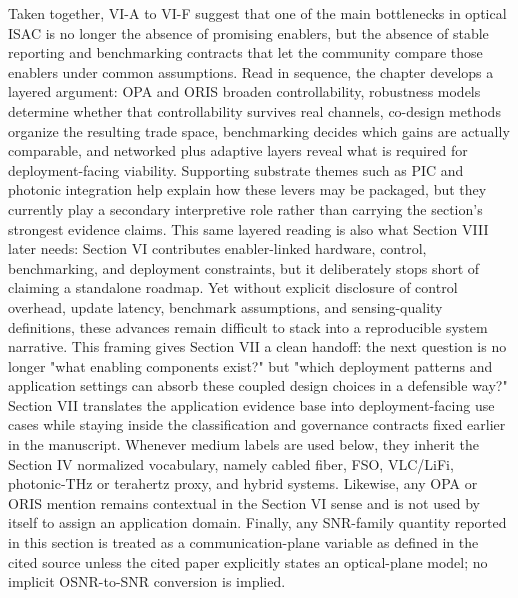 {}
\markdownRendererSectionEnd \markdownRendererSectionBegin
{}\markdownRendererInterblockSeparator
{}Taken together, VI-A to VI-F suggest that one of the main bottlenecks in optical ISAC is no longer the absence of promising enablers, but the absence of stable reporting and benchmarking contracts that let the community compare those enablers under common assumptions. Read in sequence, the chapter develops a layered argument: OPA and ORIS broaden controllability, robustness models determine whether that controllability survives real channels, co-design methods organize the resulting trade space, benchmarking decides which gains are actually comparable, and networked plus adaptive layers reveal what is required for deployment-facing viability. Supporting substrate themes such as PIC and photonic integration help explain how these levers may be packaged, but they currently play a secondary interpretive role rather than carrying the section's strongest evidence claims. This same layered reading is also what Section VIII later needs: Section VI contributes enabler-linked hardware, control, benchmarking, and deployment constraints, but it deliberately stops short of claiming a standalone roadmap. Yet without explicit disclosure of control overhead, update latency, benchmark assumptions, and sensing-quality definitions, these advances remain difficult to stack into a reproducible system narrative.\markdownRendererParagraphSeparator
{}This framing gives Section VII a clean handoff: the next question is no longer "what enabling components exist?" but "which deployment patterns and application settings can absorb these coupled design choices in a defensible way?"\markdownRendererInterblockSeparator
{}
\markdownRendererSectionEnd 
\markdownRendererSectionEnd \markdownRendererSectionBegin
{}\markdownRendererInterblockSeparator
{}Section VII translates the application evidence base into deployment-facing use cases while staying inside the classification and governance contracts fixed earlier in the manuscript. Whenever medium labels are used below, they inherit the Section IV normalized vocabulary, namely cabled fiber, FSO, VLC/LiFi, photonic-THz or terahertz proxy, and hybrid systems. Likewise, any OPA or ORIS mention remains contextual in the Section VI sense and is not used by itself to assign an application domain. Finally, any SNR-family quantity reported in this section is treated as a communication-plane variable as defined in the cited source unless the cited paper explicitly states an optical-plane model; no implicit OSNR-to-SNR conversion is implied.\markdownRendererParagraphSeparator
